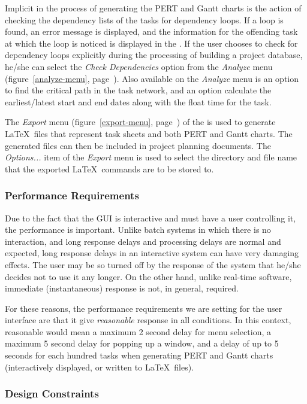Implicit in the process of generating the PERT and Gantt charts is the
action of checking the dependency lists of the tasks for dependency
loops.  If a loop is found, an error message is displayed, and the
information for the offending task at which the loop is noticed is
displayed in the \tiscreen.  If the user chooses to check for
dependency loops explicitly during the processing of building a
project database, he/she can select the {\em Check Dependencies}\/
option from the {\em Analyze}\/ menu (figure~\ref{analyze-menu},
page~\pageref{analyze-menu}).  Also available on the {\em Analyze}\/
menu is an option to find the critical path in the task network, and
an option calculate the earliest/latest start and end dates along with
the float time for the task.

The {\em Export}\/ menu (figure~\ref{export-menu},
page~\pageref{export-menu}) of the \tiscreen\/ is used to generate
\LaTeX\ files that represent task sheets and both PERT and Gantt
charts.  The generated files can then be included in project planning
documents.  The {\em Options...}\/ item of the {\em Export}\/ menu is
used to select the directory and file name that the exported \LaTeX\
commands are to be stored to.

\subsubsection{Performance Requirements}

Due to the fact that the GUI is interactive and must have a user
controlling it, the performance is important.  Unlike batch systems in
which there is no interaction, and long response delays and processing
delays are normal and expected, long response delays in an interactive
system can have very damaging effects.  The user may be so turned off
by the response of the system that he/she decides not to use it any
longer.  On the other hand, unlike real-time software, immediate
(instantaneous) response is not, in general, required.

For these reasons, the performance requirements we are setting for the
user interface are that it give {\em reasonable}\/ response in all
conditions.  In this context, reasonable would mean a maximum 2
second delay for menu selection, a maximum 5 second delay for popping
up a window, and a delay of up to 5 seconds for each hundred tasks
when generating PERT and Gantt charts (interactively displayed, or
written to \LaTeX\ files).

\subsubsection{Design Constraints}

